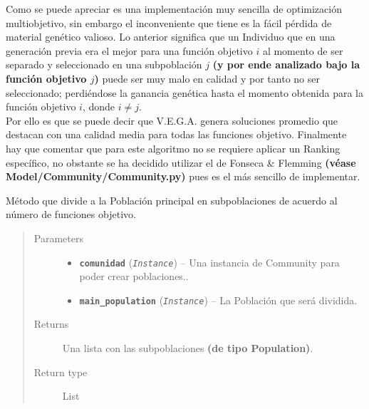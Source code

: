 \documentclass[class=report, crop=false]{standalone}
\begin{document}
Como se puede apreciar es una implementación muy sencilla 
de optimización multiobjetivo, sin embargo el inconveniente 
que tiene es la fácil pérdida de material genético valioso.\break
Lo anterior significa que un Individuo que en una generación 
previa era el mejor para una función objetivo \(i\) al momento 
de ser separado y seleccionado en una subpoblación \(j\) \textbf{(y por ende analizado bajo la función objetivo \(j\))} 
puede ser muy malo en calidad y por tanto no ser seleccionado;
perdiéndose la ganancia genética hasta el momento obtenida para la función 
objetivo $i$, donde $i \ne j$.\\ Por ello es que se puede decir 
que V.E.G.A. genera soluciones promedio que destacan con una 
calidad media para todas las funciones objetivo.\medskip\break
Finalmente hay que comentar que para este algoritmo no se requiere 
aplicar un Ranking específico, no obstante se ha decidido utilizar 
el de Fonseca \& Flemming \textbf{(véase Model/Community/Community.py)} 
pues es el más sencillo de implementar.

\begin{fulllineitems}

Método que divide a la Población principal en 
subpoblaciones de acuerdo al número de funciones 
objetivo.

\begin{quote}\begin{description}
\item[{Parameters}] \leavevmode\begin{itemize}
\item \textbf{\texttt{comunidad}} (\emph{\texttt{Instance}}) -- Una instancia de Community para poder crear
poblaciones..
\item \textbf{\texttt{main\_population}} (\emph{\texttt{Instance}}) -- La Población que será dividida.
\end{itemize}
\item[{Returns}] \leavevmode
Una lista con las subpoblaciones \textbf{(de tipo Population)}.
\item[{Return type}] \leavevmode
List
\end{description}\end{quote}

\end{fulllineitems}
\end{document}
